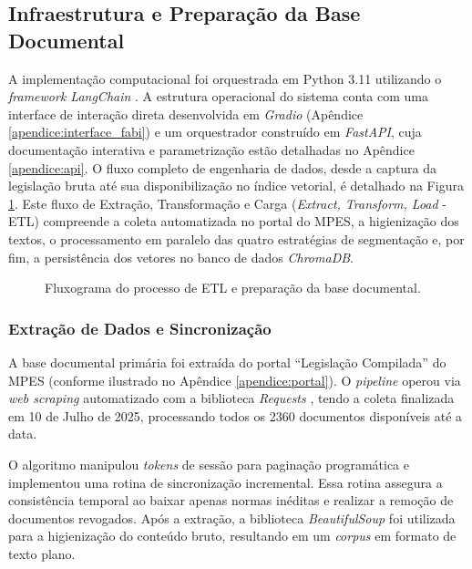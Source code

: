 \subsection{Infraestrutura e Preparação da Base Documental}

A implementação computacional foi orquestrada em Python 3.11 utilizando o \textit{framework LangChain} \citep{langchain2023}. A estrutura operacional do sistema conta com uma interface de interação direta desenvolvida em \textit{Gradio} (Apêndice \ref{apendice:interface_fabi}) e um orquestrador construído em \textit{FastAPI}, cuja documentação interativa e parametrização estão detalhadas no Apêndice \ref{apendice:api}. O fluxo completo de engenharia de dados, desde a captura da legislação bruta até sua disponibilização no índice vetorial, é detalhado na Figura \ref{fig:etl_chunking_pipeline}. Este fluxo de Extração, Transformação e Carga  (\textit{Extract, Transform, Load} - ETL) compreende a coleta automatizada no portal do MPES, a higienização dos textos, o processamento em paralelo das quatro estratégias de segmentação e, por fim, a persistência dos vetores no banco de dados \textit{ChromaDB}.

\begin{figure}[ht]
  \centering
  
  \caption{Fluxograma do processo de ETL e preparação da base documental.}
  \label{fig:etl_chunking_pipeline}
\end{figure}

\subsubsection{Extração de Dados e Sincronização}

A base documental primária foi extraída do portal ``Legislação Compilada'' \cite{mpes2024} do MPES (conforme ilustrado no Apêndice \ref{apendice:portal}). O \textit{pipeline} operou via \textit{web scraping} automatizado com a biblioteca \textit{Requests} \citep{reitz2023requests}, tendo a coleta finalizada em 10 de Julho de 2025, processando todos os 2360 documentos disponíveis até a data.

O algoritmo manipulou \textit{tokens} de sessão para paginação programática e implementou uma rotina de sincronização incremental. Essa rotina assegura a consistência temporal ao baixar apenas normas inéditas e realizar a remoção de documentos revogados. Após a extração, a biblioteca \textit{BeautifulSoup} foi utilizada para a higienização do conteúdo bruto, resultando em um \textit{corpus} em formato de texto plano.

